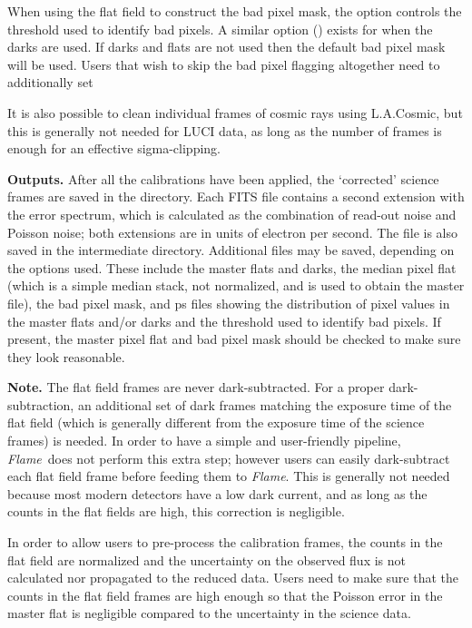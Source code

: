 \documentclass[a4paper]{article}
\newcommand{\flame}{\emph{Flame}}
\begin{document}
\begin{sloppypar}
When using the flat field to construct the bad pixel mask, the option  controls the threshold used to identify bad pixels. A similar option () exists for when the darks are used. If darks and flats are not used then the default bad pixel mask will be used. Users that wish to skip the bad pixel flagging altogether need to additionally set 

It is also possible to clean individual frames of cosmic rays using L.A.Cosmic, but this is generally not needed for LUCI data, as long as the number of frames is enough for an effective sigma-clipping.

\medskip
\noindent
\textbf{Outputs.} After all the calibrations have been applied, the `corrected' science frames are saved in the  directory. Each FITS file contains a second extension with the error spectrum, which is calculated as the combination of read-out noise and Poisson noise; both extensions are in units of electron per second. The  file is also saved in the intermediate directory. Additional files may be saved, depending on the options used. These include the master flats and darks, the median pixel flat (which is a simple median stack, not normalized, and is used to obtain the master file), the bad pixel mask, and ps files showing the distribution of pixel values in the master flats and/or darks and the threshold used to identify bad pixels. If present, the master pixel flat and bad pixel mask should be checked to make sure they look reasonable.


\medskip
\noindent
\textbf{Note.} The flat field frames are never dark-subtracted. For a proper dark-subtraction, an additional set of dark frames matching the exposure time of the flat field (which is generally different from the exposure time of the science frames) is needed. In order to have a simple and user-friendly pipeline, \flame\ does not perform this extra step; however users can easily dark-subtract each flat field frame before feeding them to \flame. This is generally not needed because most modern detectors have a low dark current, and as long as the counts in the flat fields are high, this correction is negligible.

In order to allow users to pre-process the calibration frames, the counts in the flat field are normalized and the uncertainty on the observed flux is not calculated nor propagated to the reduced data. Users need to make sure that the counts in the flat field frames are high enough so that the Poisson error in the master flat is negligible compared to the uncertainty in the science data.



\end{sloppypar}
\end{document}
